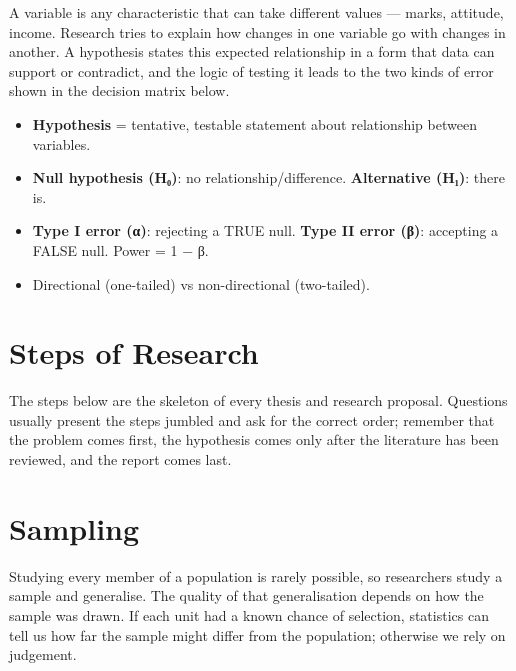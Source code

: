 A variable is any characteristic that can take different values --- marks, attitude, income. Research tries
to explain how changes in one variable go with changes in another. A hypothesis states this expected
relationship in a form that data can support or contradict, and the logic of testing it leads to the two
kinds of error shown in the decision matrix below.





\begin{itemize}
\tightlist
\item
  \textbf{Hypothesis} = tentative, testable statement about relationship between variables.
\item
  \textbf{Null hypothesis (H₀)}: no relationship/difference. \textbf{Alternative (H₁)}: there is.
\item
  \textbf{Type I error (α)}: rejecting a TRUE null. \textbf{Type II error (β)}: accepting a FALSE null. Power = 1 − β.
\item
  Directional (one-tailed) vs non-directional (two-tailed).
\end{itemize}

\needspace{125pt}

\hypertarget{p1-02--4-steps-of-research}{%
\section{Steps of Research}\label{p1-02--4-steps-of-research}}

The steps below are the skeleton of every thesis and research proposal. Questions usually present the
steps jumbled and ask for the correct order; remember that the problem comes first, the hypothesis comes
only after the literature has been reviewed, and the report comes last.



\needspace{125pt}

\hypertarget{p1-02--5-sampling}{%
\section{Sampling}\label{p1-02--5-sampling}}

Studying every member of a population is rarely possible, so researchers study a sample and generalise.
The quality of that generalisation depends on how the sample was drawn. If each unit had a known chance of
selection, statistics can tell us how far the sample might differ from the population; otherwise we rely on
judgement.


